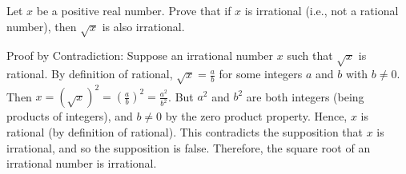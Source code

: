 \question Let $x$ be a positive real number. Prove that if 
$x$ is irrational (i.e., not a rational number), then $\sqrt{x}$ 
is also irrational.

\begin{solution}[3in]
Proof by Contradiction:
Suppose an irrational number $x$ such that $\sqrt{x}$ is rational.
By definition of rational, $\sqrt{x} = \frac{a}{b}$ for some integers 
$a$ and $b$ with $b \neq 0$. Then $x = (\sqrt{x})^2 = (\frac{a}{b})^2 
= \frac{a^2}{b^2}$. But $a^2$ and $b^2$ are both integers 
(being products of integers), and $b \neq 0$ by the zero product property. 
Hence, $x$ is rational (by definition of rational). This contradicts the 
supposition that $x$ is irrational, and so the supposition is false. 
Therefore, the square root of an irrational number is irrational.
\end{solution}